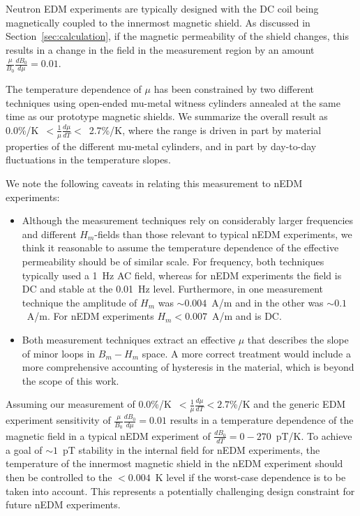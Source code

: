Neutron EDM experiments are typically designed with the DC coil being
magnetically coupled to the innermost magnetic shield.  As discussed
in Section~\ref{sec:calculation}, if the magnetic permeability of the
shield changes, this results in a change in the field in the
measurement region by an amount
$\frac{\mu}{B_0}\frac{dB_0}{d\mu}=0.01$.

The temperature dependence of $\mu$ has been constrained by two
different techniques using open-ended mu-metal witness cylinders
annealed at the same time as our prototype magnetic shields.  We
summarize the overall result as
0.0\%/K~$<\frac{1}{\mu}\frac{d\mu}{dT}<$~2.7\%/K, where the range is
driven in part by material properties of the different mu-metal
cylinders, and in part by day-to-day fluctuations in the temperature
slopes.



We note the following caveats in relating this measurement to nEDM
experiments:
\begin{itemize}
\item Although the measurement techniques rely on considerably larger
  frequencies and different $H_m$-fields than those relevant to
  typical nEDM experiments, we think it reasonable to assume the
  temperature dependence of the effective permeability should be of
  similar scale.  For frequency, both techniques typically used a 1~Hz
  AC field, whereas for nEDM experiments the field is DC and stable at
  the 0.01~Hz level.  Furthermore, in one measurement technique the
  amplitude of $H_m$ was $\sim 0.004$~A/m and in the other was $\sim
  0.1$~A/m.  For nEDM experiments $H_m<0.007$~A/m and is DC.
\item Both measurement techniques extract an effective $\mu$ that
  describes the slope of minor loops in $B_m-H_m$ space.  A more
  correct treatment would include a more comprehensive accounting of
  hysteresis in the material, which is beyond the scope of this work.
\end{itemize}

Assuming our measurement of
0.0\%/K~$<\frac{1}{\mu}\frac{d\mu}{dT}<2.7$\%/K and the generic EDM
experiment sensitivity of $\frac{\mu}{B_0}\frac{dB_0}{d\mu}=0.01$
results in a temperature dependence of the magnetic field in a typical
nEDM experiment of $\frac{dB_0}{dT}=0-270$~pT/K.  To achieve a goal of
$\sim 1$~pT stability in the internal field for nEDM experiments, the
temperature of the innermost magnetic shield in the nEDM experiment
should then be controlled to the $<0.004$~K level if the worst-case
dependence is to be taken into account.  This represents a potentially
challenging design constraint for future nEDM experiments.

